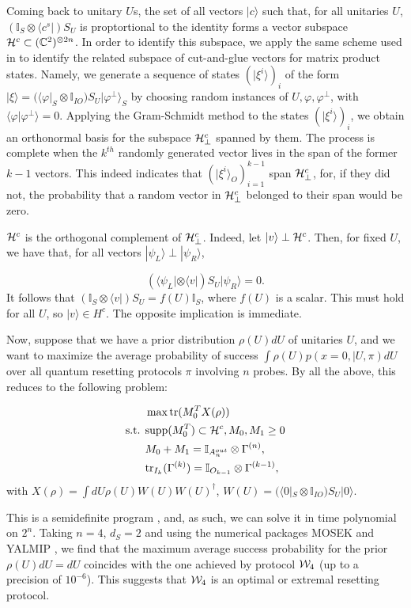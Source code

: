 \documentclass[twocolumn,prx,aps,longbibliography]{revtex4-1}
\def\be{\begin{equation}}
\def\ee{\end{equation}}
\def\H{{\cal H}}
\def\C{{\mathbb C}}
\def\id{{\mathbb I}}
\def\H{{\cal H}}
\def\tr{\mbox{tr}}
\def\bra#1{\langle#1|} \def\ket#1{|#1\rangle}
\def\braket#1#2{\langle#1|#2\rangle}
\def\id{{\mathbb I}}
\begin{document}
\begin{appendix}
Coming back to unitary $U$s, the set of all vectors $\ket{c}$ such that, for all unitaries $U$, $(\id_S\otimes \bra{c^s})S_U$ is proptortional to the identity forms a vector subspace $\H^c\subset (\C^{2})^{\otimes 2n}$. In order to identify this subspace, we apply the same scheme used in \cite{MPS} to identify the related subspace of cut-and-glue vectors for matrix product states. Namely, we generate a sequence of states $(\ket{\xi^i})_i$ of the form $\ket{\xi}=(\bra{\varphi}_S\otimes \id_{IO}) S_{U}\ket{\varphi^\perp}_S$ by choosing random instances of $U, \varphi, \varphi^\perp$, with $\braket{\varphi}{\varphi^\perp}=0$. Applying the Gram-Schmidt method to the states $(\ket{\xi^i})_i$, we obtain an orthonormal basis for the subspace $\H^c_\perp$ spanned by them. The process is complete when the $k^{th}$ randomly generated vector lives in the span of the former $k-1$ vectors. This indeed indicates that $(\ket{\xi^i}_O)_{i=1}^{k-1}$ span $\H_\perp^c$, for, if they did not, the probability that a random vector in $\H_\perp^c$ belonged to their span would be zero.

$\H^c$ is the orthogonal complement of $\H^c_\perp$. Indeed, let $\ket{v}\perp \H^c$. Then, for fixed $U$, we have that, for all vectors $\ket{\psi_L}\perp\ket{\psi_R}$,

\be
(\bra{\psi_L}\otimes\bra{v})S_U\ket{\psi_R}=0.
\ee
\noindent It follows that $(\id_{S}\otimes\bra{v})S_U=f(U) \id_S$, where $f(U)$ is a scalar. This must hold for all $U$, so $\ket{v}\in H^c$. The opposite implication is immediate.


Now, suppose that we have a prior distribution $\rho(U)dU$ of unitaries $U$, and we want to maximize the average probability of success $\int \rho(U)p(x=0,|U,\pi)dU$ over all quantum resetting protocols $\pi$ involving $n$ probes. By all the above, this reduces to the following problem:

\begin{align}
&\max\tr(M^T_0X(\rho))\nonumber\\
\mbox{s.t. }&\mbox{supp}(M^T_0)\subset \H^c,M_0,M_1\geq 0\nonumber\\
&M_0+M_1=\id_{A_n^{out}}\otimes \Gamma^{(n)}, \nonumber\\
&\tr_{I_{k}}(\Gamma^{(k)})=\id_{O_{k-1}}\otimes \Gamma^{(k-1)},
\label{SDP_char}
\end{align}
\noindent with $X(\rho)=\int dU \rho(U) W(U)W(U)^\dagger$, $W(U)=(\bra{0}_S\otimes\id_{IO})S_U\ket{0}$.

\noindent This is a semidefinite program \cite{sdp}, and, as such, we can solve it in time polynomial on $2^n$. Taking $n=4$, $d_S=2$ and using the numerical packages MOSEK \cite{mosek} and YALMIP \cite{yalmip}, we find that the maximum average success probability for the prior $\rho(U)dU=dU$ coincides with the one achieved by protocol ${\cal W}_4$ (up to a precision of $10^{-6}$). This suggests that ${\cal W}_4$ is an optimal or extremal resetting protocol. 



\end{appendix}
\end{document}
